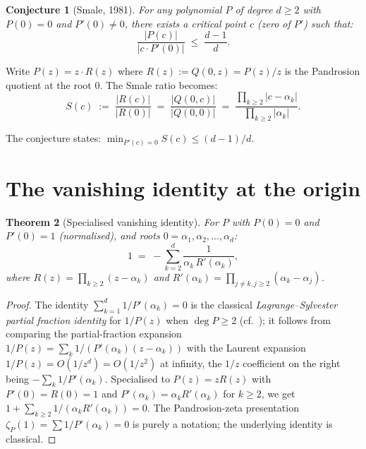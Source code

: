 \documentclass[11pt,a4paper]{article}
\newtheorem{theorem}{Theorem}[section]
\newtheorem{conjecture}[theorem]{Conjecture}
\begin{document}
\begin{conjecture}[Smale, 1981]
For any polynomial $P$ of degree $d \ge 2$ with $P(0) = 0$ and $P'(0) \ne 0$, there exists a critical point $c$ (zero of $P'$) such that:
\begin{equation}
\frac{|P(c)|}{|c \cdot P'(0)|} \;\le\; \frac{d - 1}{d}.
\end{equation}
\end{conjecture}

Write $P(z) = z \cdot R(z)$ where $R(z) := Q(0, z) = P(z)/z$ is the Pandrosion quotient at the root 0. The Smale ratio becomes:
\begin{equation}
\boxed{S(c) \;:=\; \frac{|R(c)|}{|R(0)|} \;=\; \frac{|Q(0, c)|}{|Q(0, 0)|} \;=\; \frac{\prod_{k \ge 2} |c - \alpha_k|}{\prod_{k \ge 2} |\alpha_k|}.}
\end{equation}

The conjecture states: $\min_{P'(c) = 0} S(c) \le (d - 1)/d$.

\section{The vanishing identity at the origin}

\begin{theorem}[Specialised vanishing identity]
For $P$ with $P(0) = 0$ and $P'(0) = 1$ (normalised), and roots $0 = \alpha_1, \alpha_2, \dots, \alpha_d$:
\begin{equation}
\boxed{1 \;=\; -\sum_{k=2}^{d} \frac{1}{\alpha_k\, R'(\alpha_k)},}
\end{equation}
where $R(z) = \prod_{k \ge 2} (z - \alpha_k)$ and $R'(\alpha_k) = \prod_{j \ne k, j \ge 2} (\alpha_k - \alpha_j)$.
\end{theorem}

\begin{proof}
The identity $\sum_{k=1}^d 1/P'(\alpha_k) = 0$ is the classical \emph{Lagrange--Sylvester partial fraction identity} for $1/P(z)$ when $\deg P \ge 2$ (cf.\ \cite[Ch.~5]{markushevich}); it follows from comparing the partial-fraction expansion $1/P(z) = \sum_k 1/(P'(\alpha_k)(z - \alpha_k))$ with the Laurent expansion $1/P(z) = O(1/z^d) = O(1/z^2)$ at infinity, the $1/z$ coefficient on the right being $-\sum_k 1/P'(\alpha_k)$. Specialised to $P(z) = z R(z)$ with $P'(0) = R(0) = 1$ and $P'(\alpha_k) = \alpha_k R'(\alpha_k)$ for $k \ge 2$, we get $1 + \sum_{k \ge 2} 1/(\alpha_k R'(\alpha_k)) = 0$. The Pandrosion-zeta presentation~$\zeta_P(1) = \sum 1/P'(\alpha_k) = 0$ is purely a notation; the underlying identity is classical. \qedhere
\end{proof}
\end{document}
